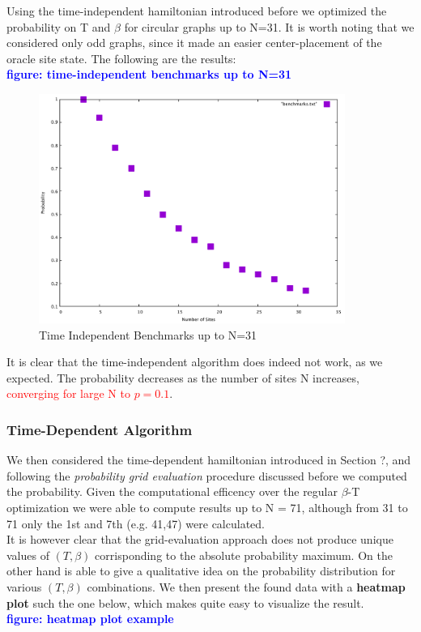 \documentclass[aps,pra,reprint, onecolumn, showkeys]{revtex4-2}
\newcommand{\red}[1]{\textcolor{red}{#1}}
\newcommand{\blue}[1]{\textcolor{blue}{\textbf{figure: #1}}}
\begin{document}
Using the time-independent hamiltonian introduced before we optimized the probability on T and $\beta$ for circular graphs up to N=31. It is worth noting that we considered only odd graphs, since it made an easier center-placement of the oracle site state. The following are the results:\\
\blue{time-independent benchmarks up to N=31}\\

\begin{figure}[ht]
\includegraphics[width=10cm]{./figures/benchmarks.pdf}%
\caption{Time Independent Benchmarks up to N=31}
\end{figure}

It is clear that the time-independent algorithm does indeed not work, as we expected. The probability decreases as the number of sites N increases, \red{converging for large N to $p=0.1$}.

\subsubsection{Time-Dependent Algorithm}
We then considered the time-dependent hamiltonian introduced in Section ?, and following the \textit{probability grid evaluation} procedure discussed before we computed the probability. Given the computational efficency over the regular $\beta$-T optimization we were able to compute results up to N = 71, although from 31 to 71 only the 1st and 7th (e.g. 41,47) were calculated. \\

It is however clear that the grid-evaluation approach does not produce unique values of $(T,\beta)$ corrisponding to the absolute probability maximum. On the other hand is able to give a qualitative idea on the probability distribution for various $(T,\beta)$ combinations. We then present the found data with a \textbf{heatmap plot} such the one below, which makes quite easy to visualize the result.\\ \blue{heatmap plot example}\\
\end{document}

